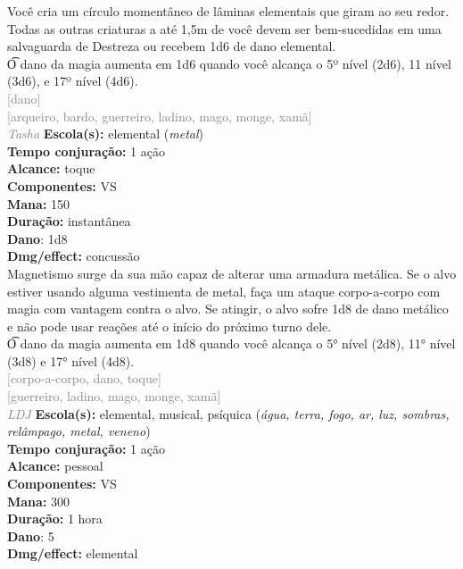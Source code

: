 \documentclass{RPG_Adventure}[2021/10/20]
\begin{document}
{\normalsize Você cria um círculo momentâneo de lâminas elementais que giram ao seu redor. Todas as outras criaturas a até 1,5m de você devem ser bem-sucedidas em uma salvaguarda de Destreza ou recebem 1d6 de dano elemental.\\\t O dano da magia aumenta em 1d6 quando você alcança o 5º nível (2d6), 11 nível (3d6), e 17º nível (4d6).\\}
{\scriptsize \textcolor{gray}{[dano]\\}}
{\scriptsize \textcolor{gray}{[arqueiro, bardo, guerreiro, ladino, mago, monge, xamã]\\}}
{\tiny \textcolor{gray}{\textit{Tasha}}}\jump{}
{\small \t \textbf{Escola(s):} elemental (\textit{metal})\\\t \textbf{Tempo conjuração:} 1 ação\\\t \textbf{Alcance:} toque\\\t \textbf{Componentes:} VS\\\t \textbf{Mana:} 150\\\t \textbf{Duração:} instantânea\\\t \textbf{Dano}: 1d8\\\t \textbf{Dmg/effect:} concussão\\}
{\normalsize Magnetismo surge da sua mão capaz de alterar uma armadura metálica. Se o alvo estiver usando alguma vestimenta de metal, faça um ataque corpo-a-corpo com magia com vantagem contra o alvo. Se atingir, o alvo sofre 1d8 de dano metálico e não pode usar reações até o início do próximo turno dele.\\\t O dano da magia aumenta em 1d8 quando você alcança o 5° nível (2d8), 11° nível (3d8) e 17° nível (4d8).\\}
{\scriptsize \textcolor{gray}{[corpo-a-corpo, dano, toque]\\}}
{\scriptsize \textcolor{gray}{[guerreiro, ladino, mago, monge, xamã]\\}}
{\tiny \textcolor{gray}{\textit{LDJ}}}\jump{}
{\small \t \textbf{Escola(s):} elemental, musical, psíquica (\textit{água, terra, fogo, ar, luz, sombras, relâmpago, metal, veneno})\\\t \textbf{Tempo conjuração:} 1 ação\\\t \textbf{Alcance:} pessoal\\\t \textbf{Componentes:} VS\\\t \textbf{Mana:} 300\\\t \textbf{Duração:} 1 hora\\\t \textbf{Dano}: 5\\\t \textbf{Dmg/effect:} elemental\\}
\end{document}
